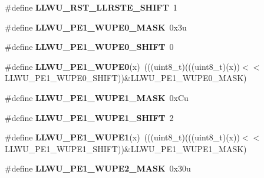 \begin{DoxyCompactItemize}
\item 
\#define {\bfseries L\+L\+W\+U\+\_\+\+R\+S\+T\+\_\+\+L\+L\+R\+S\+T\+E\+\_\+\+S\+H\+I\+FT}~1\hypertarget{group__LLWU__Register__Masks_gaf1c8b75e71d3086612da4e1e2f768d72}{}\label{group__LLWU__Register__Masks_gaf1c8b75e71d3086612da4e1e2f768d72}

\item 
\#define {\bfseries L\+L\+W\+U\+\_\+\+P\+E1\+\_\+\+W\+U\+P\+E0\+\_\+\+M\+A\+SK}~0x3u\hypertarget{group__LLWU__Register__Masks_ga6ed6c56a8797caa64d27eb915c164dad}{}\label{group__LLWU__Register__Masks_ga6ed6c56a8797caa64d27eb915c164dad}

\item 
\#define {\bfseries L\+L\+W\+U\+\_\+\+P\+E1\+\_\+\+W\+U\+P\+E0\+\_\+\+S\+H\+I\+FT}~0\hypertarget{group__LLWU__Register__Masks_ga234c02ee9c2b3e3e248c90473e922336}{}\label{group__LLWU__Register__Masks_ga234c02ee9c2b3e3e248c90473e922336}

\item 
\#define {\bfseries L\+L\+W\+U\+\_\+\+P\+E1\+\_\+\+W\+U\+P\+E0}(x)~(((uint8\+\_\+t)(((uint8\+\_\+t)(x))$<$$<$L\+L\+W\+U\+\_\+\+P\+E1\+\_\+\+W\+U\+P\+E0\+\_\+\+S\+H\+I\+FT))\&L\+L\+W\+U\+\_\+\+P\+E1\+\_\+\+W\+U\+P\+E0\+\_\+\+M\+A\+SK)\hypertarget{group__LLWU__Register__Masks_ga61f1d3c27404e82bdebb9627e83f35dd}{}\label{group__LLWU__Register__Masks_ga61f1d3c27404e82bdebb9627e83f35dd}

\item 
\#define {\bfseries L\+L\+W\+U\+\_\+\+P\+E1\+\_\+\+W\+U\+P\+E1\+\_\+\+M\+A\+SK}~0x\+Cu\hypertarget{group__LLWU__Register__Masks_gac0c417f78992f2ebaca7267ef06d888a}{}\label{group__LLWU__Register__Masks_gac0c417f78992f2ebaca7267ef06d888a}

\item 
\#define {\bfseries L\+L\+W\+U\+\_\+\+P\+E1\+\_\+\+W\+U\+P\+E1\+\_\+\+S\+H\+I\+FT}~2\hypertarget{group__LLWU__Register__Masks_gaa9b8224f389f9c3d4f13772d8e5fbeee}{}\label{group__LLWU__Register__Masks_gaa9b8224f389f9c3d4f13772d8e5fbeee}

\item 
\#define {\bfseries L\+L\+W\+U\+\_\+\+P\+E1\+\_\+\+W\+U\+P\+E1}(x)~(((uint8\+\_\+t)(((uint8\+\_\+t)(x))$<$$<$L\+L\+W\+U\+\_\+\+P\+E1\+\_\+\+W\+U\+P\+E1\+\_\+\+S\+H\+I\+FT))\&L\+L\+W\+U\+\_\+\+P\+E1\+\_\+\+W\+U\+P\+E1\+\_\+\+M\+A\+SK)\hypertarget{group__LLWU__Register__Masks_gab35a751adac37592806af18a4f6e3837}{}\label{group__LLWU__Register__Masks_gab35a751adac37592806af18a4f6e3837}

\item 
\#define {\bfseries L\+L\+W\+U\+\_\+\+P\+E1\+\_\+\+W\+U\+P\+E2\+\_\+\+M\+A\+SK}~0x30u\hypertarget{group__LLWU__Register__Masks_ga97e8e2fc8ce673f6b4625d307bc94b4a}{}\label{group__LLWU__Register__Masks_ga97e8e2fc8ce673f6b4625d307bc94b4a}


\end{DoxyCompactItemize}
